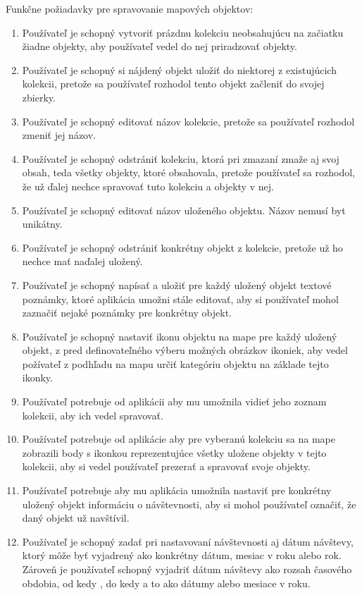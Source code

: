 Funkčne požiadavky pre spravovanie mapových objektov:
\begin{enumerate}
      \item Používateľ je schopný vytvoriť prázdnu kolekciu neobsahujúcu na začiatku žiadne objekty, aby používateľ vedel do nej priradzovať objekty.
      \item Používateľ je schopný si nájdený objekt uložiť do niektorej z existujúcich kolekcii, pretože sa používateľ rozhodol tento objekt začleniť do svojej zbierky.
      \item Používateľ je schopný editovať názov kolekcie, pretože sa používateľ rozhodol zmeniť jej názov.
      \item Používateľ je schopný odstrániť kolekciu, ktorá pri zmazaní zmaže aj svoj obsah, teda všetky objekty, ktoré obsahovala, pretože používateľ sa rozhodol, že už ďalej nechce spravovať tuto kolekciu a objekty v nej.
      \item Používateľ je schopný editovať názov uloženého objektu. Názov nemusí byt unikátny.
      \item Používateľ je schopný odstrániť konkrétny objekt z kolekcie, pretože už ho nechce mať naďalej uložený.
      \item Používateľ je schopný napísať a uložiť pre každý uložený objekt textové poznámky, ktoré aplikácia umožni stále editovať, aby si používateľ mohol zaznačiť nejaké poznámky pre konkrétny objekt.
      \item Používateľ je schopný nastaviť ikonu objektu na mape pre každý uložený objekt, z pred definovateľného výberu možných obrázkov ikoniek, aby vedel požívateľ z podhľadu na mapu určiť kategóriu objektu na základe tejto ikonky.
      \item Používateľ potrebuje od aplikácii aby mu umožnila vidieť jeho zoznam kolekcii, aby ich vedel spravovať.
      \item Používateľ potrebuje od aplikácie aby pre vyberanú kolekciu sa na mape zobrazili body s ikonkou reprezentujúce všetky uložene objekty v tejto kolekcii, aby si vedel používateľ prezerať a spravovať svoje objekty.
      \item Používateľ potrebuje aby mu aplikácia umožnila nastaviť pre konkrétny uložený objekt informáciu o návštevnosti, aby si mohol používateľ označiť, že daný objekt už navštívil.
      \item Používateľ je schopný zadať pri nastavovaní návštevnosti aj dátum návštevy, ktorý môže byť vyjadrený ako konkrétny dátum, mesiac v roku alebo rok.
            Zároveň je používateľ schopný vyjadriť dátum návštevy ako rozsah časového obdobia, od kedy , do kedy a to ako dátumy alebo mesiace v roku.

\end{enumerate}
